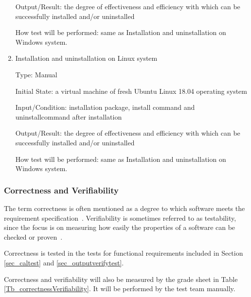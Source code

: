 \documentclass[12pt, titlepage]{article}
\begin{document}
\begin{enumerate}
Output/Result: the degree of effectiveness and efficiency with which
\progname{}can be successfully installed and/or uninstalled
					
How test will be performed: same as Installation and uninstallation on Windows
system.

\item{Installation and uninstallation on Linux system}

Type: Manual
					
Initial State: a virtual machine of fresh Ubuntu Linux 18.04 operating system
					
Input/Condition: \progname{} installation package, install command and
uninstallcommand after installation
					
Output/Result: the degree of effectiveness and efficiency with which
\progname{}can be successfully installed and/or uninstalled
					
How test will be performed: same as Installation and uninstallation on Windows
system.
\end{enumerate}


\subsubsection{Correctness and Verifiability} \label{sec_correctverfiabletest}

The term correctness is often mentioned as a degree to which software meets the
requirement specification~\cite{IEEE1990}.  Verifiability is sometimes referred
to as testability, since the focus is on measuring how easily the properties of
a software can be checked or proven~\cite{SmithEtAl2018}.
		
Correctness is tested in the tests for functional
requirements included in Section \ref{sec_caltest} and
\ref{sec_outputverifytest}. 

Correctness and verifiability will also be measured by the grade sheet in Table
\ref{Tb_correctnessVerifiability}. It will be performed by the test team
manually.
\end{document}
